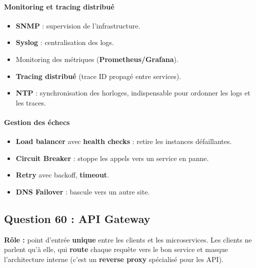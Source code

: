 \documentclass[12pt,a4paper]{article}
\begin{document}
\paragraph{Monitoring et tracing distribu\'e}
\begin{itemize}
  \item \textbf{SNMP} : supervision de l'infrastructure.
  \item \textbf{Syslog} : centralisation des logs.
  \item Monitoring des m\'etriques (\textbf{Prometheus/Grafana}).
  \item \textbf{Tracing distribu\'e} (trace ID propag\'e entre services).
  \item \textbf{NTP} : synchronisation des horloges, indispensable pour ordonner les logs et les traces.
\end{itemize}

\paragraph{Gestion des \'echecs}
\begin{itemize}
  \item \textbf{Load balancer} avec \textbf{health checks} : retire les instances d\'efaillantes.
  \item \textbf{Circuit Breaker} : stoppe les appels vers un service en panne.
  \item \textbf{Retry} avec backoff, \textbf{timeout}.
  \item \textbf{DNS Failover} : bascule vers un autre site.
\end{itemize}

\subsection*{Question 60 : API Gateway}

\textbf{R\^ole :} point d'entr\'ee \textbf{unique} entre les clients et les microservices. Les clients ne parlent qu'\`a elle, qui \textbf{route} chaque requ\^ete vers le bon service et masque l'architecture interne (c'est un \textbf{reverse proxy} sp\'ecialis\'e pour les API).
\end{document}
